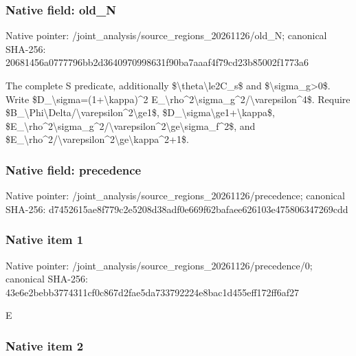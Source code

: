 \documentclass[10pt,a4paper]{article}
\begin{document}
\subsubsection{Native field: old\_N}


Native pointer: /joint\_analysis/source\_r\allowbreak{}egions\_20261126/old\_N; canonical SHA-256: 20681456a0777796bb2d3640\allowbreak{}970998631f90ba7aaaf4f79c\allowbreak{}d23b85002f1773a6


The complete S predicate, additionally \$\textbackslash{}theta\textbackslash{}le2C\_s\$ and \$\textbackslash{}sigma\_g>0\$. Write \$D\_\textbackslash{}sigma=(1+\textbackslash{}kappa)\textasciicircum{}2 E\_\textbackslash{}rho\textasciicircum{}2\textbackslash{}sigma\_g\textasciicircum{}2/\textbackslash{}varepsilon\textasciicircum{}4\$. Require \$B\_\textbackslash{}Phi\textbackslash{}Delta/\textbackslash{}varepsilon\textasciicircum{}2\textbackslash{}ge1\$, \$D\_\textbackslash{}sigma\textbackslash{}ge1+\textbackslash{}kappa\$, \$E\_\textbackslash{}rho\textasciicircum{}2\textbackslash{}sigma\_g\textasciicircum{}2/\textbackslash{}var\allowbreak{}epsilon\textasciicircum{}2\textbackslash{}ge\textbackslash{}sigma\_f\textasciicircum{}2\$, and \$E\_\textbackslash{}rho\textasciicircum{}2/\textbackslash{}varepsilon\textasciicircum{}2\textbackslash{}ge\textbackslash{}kappa\textasciicircum{}2+1\$.


\subsubsection{Native field: precedence}


Native pointer: /joint\_analysis/source\_r\allowbreak{}egions\_20261126/preceden\allowbreak{}ce; canonical SHA-256: d7452615ae8f779c2e5208d3\allowbreak{}8adf0e669f62bafaee626103\allowbreak{}e475806347269cdd



\subsubsection{Native item 1}


Native pointer: /joint\_analysis/source\_r\allowbreak{}egions\_20261126/preceden\allowbreak{}ce/0; canonical SHA-256: 43e6e2bebb3774311cf0c867\allowbreak{}d2fae5da733792224e8bac1d\allowbreak{}455eff172ff6af27


E


\subsubsection{Native item 2}
\end{document}
